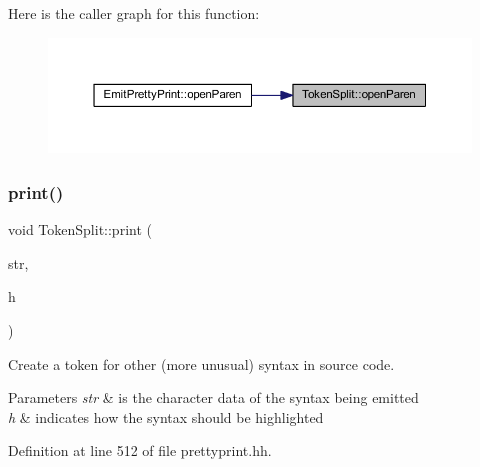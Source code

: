 Here is the caller graph for this function\+:
\nopagebreak
\begin{figure}[H]
\begin{center}
\leavevmode
\includegraphics[width=350pt]{class_token_split_a5dcdb16c6b0aafe649f1615a93c2ee1c_icgraph}
\end{center}
\end{figure}
\mbox{\label{class_token_split_a7418693a38259f2b48837c7bb9b147a4}} 
\subsubsection{\texorpdfstring{print()}{print()}\hspace{0.1cm}{\footnotesize\ttfamily [1/2]}}
{\footnotesize\ttfamily void Token\+Split\+::print (\begin{DoxyParamCaption}\item[{const char $\ast$}]{str,  }\item[{\mbox{\hyperlink{class_emit_xml_a7c3577436da429c3c75f4b82cac6864f}{Emit\+Xml\+::syntax\+\_\+highlight}}}]{h }\end{DoxyParamCaption})\hspace{0.3cm}{\ttfamily [inline]}}



Create a token for other (more unusual) syntax in source code. 


\begin{DoxyParams}{Parameters}
{\em str} & is the character data of the syntax being emitted \\
\hline
{\em h} & indicates how the syntax should be highlighted \\
\hline
\end{DoxyParams}


Definition at line 512 of file prettyprint.\+hh.

